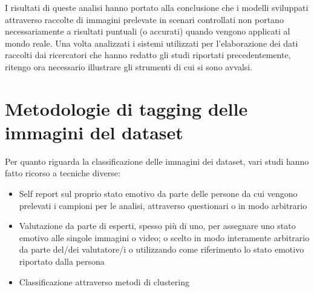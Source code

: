 I risultati di queste analisi hanno portato alla conclusione che i modelli sviluppati attraverso raccolte di immagini prelevate in scenari controllati non portano necessariamente a risultati puntuali (o accurati) quando vengono applicati al mondo reale.
Una volta analizzati i sistemi utilizzati per l’elaborazione dei dati raccolti dai ricercatori che hanno redatto gli studi riportati precedentemente, ritengo ora necessario illustrare gli strumenti di cui si sono avvalsi.

\section{Metodologie di tagging delle immagini del dataset}
Per quanto riguarda la classificazione delle immagini dei dataset, vari studi hanno fatto ricorso a tecniche diverse:
\begin{itemize}
    \item Self report sul proprio stato emotivo da parte delle persone da cui vengono prelevati i campioni per le analisi, attraverso questionari o in modo arbitrario
    \item Valutazione da parte di esperti, spesso più di uno, per assegnare uno stato emotivo alle singole immagini o video; o scelto in modo interamente arbitrario da parte del/dei valutatore/i o utilizzando come riferimento lo stato emotivo riportato dalla persona
    \item Classificazione attraverso metodi di clustering \cite{FacialExpresRecLocalBinaryPatt}
\end{itemize}

